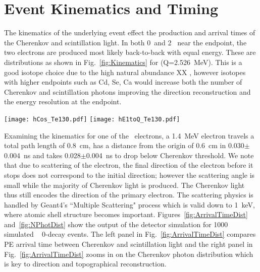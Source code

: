 \section{Event Kinematics and Timing}
\label{sec:event_timing}
The kinematics of the underlying event effect the production and arrival times of the Cherenkov and scintillation light. In both 0\nbb~and 2\nbb~ near the endpoint, the two electrons are produced most likely back-to-back with equal energy. These are distributions as shown in Fig.~\ref{fig:Kinematics} for \Te(Q=2.526~MeV). This is a good isotope choice due to the high natural abundance XX , however isotopes with higher endpoints such as Cd, Se, Ca would increase both the number of Cherenkov and scintillation photons improving the direction reconstruction and the energy resolution at the endpoint.

\begin{figure*}[ht]
  \centering
  \texttt{[image: hCos\_Te130.pdf]}
  \texttt{[image: hE1toQ\_Te130.pdf]}
  \caption{Comparison between kinematics of 0{\nbb} (\emph{dashed red
      lines}) and 2{\nbb} decays (\emph{solid black lines}) for events
    with the total kinetic energy of the electrons above 90\% of the
    Q-value. \emph{Left:} Cosine of the angle between two
    electrons. \emph{Right:} Fraction of energy carried by one of the
    two electrons. Due to limited statistic around the energy spectrum
    end point for 2{\nbb} decay we show statistical errors for each
    bin.}
  \label{fig:Kinematics}
\end{figure*}


Examining the kinematics for one of the \bb~electrons, a 1.4~MeV electron travels a total path length of 0.8~cm, has a distance from the origin of 0.6~cm in 0.030$\pm$0.004~ns  and takes 0.028$\pm$0.004~ns to drop below Cherenkov threshold. We note that due to scattering of the electron, the final direction of the electron before it stops does not correspond to the initial direction; however the scattering angle is small while the majority of Cherenkov light is produced. The Cherenkov light thus still encodes the direction of the primary electron. The scattering physics is handled by Geant4's ``Multiple Scattering" process which is valid down to 1~keV, where atomic shell structure becomes important\cite{geant4scatt}. Figures~\ref{fig:ArrivalTimeDist} and~\ref{fig:NPhotDist} show the output of the detector simulation for 1000 simulated \Te~ 0\nbb-decay events. The left panel in Fig.~\ref{fig:ArrivalTimeDist} compares PE arrival time between Cherenkov and scintillation light  and the right panel in Fig.~\ref{fig:ArrivalTimeDist} zooms in on the Cherenkov photon distribution which is key to direction and topographical reconstruction.

